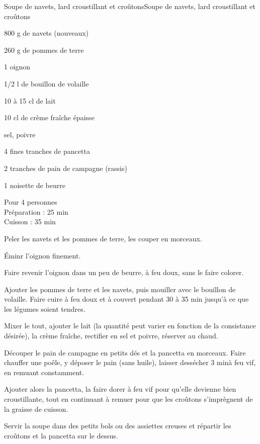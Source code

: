 \begin{recette}{Soupe de navets, lard croustillant et croûtons}{Soupe de navets, lard croustillant et croûtons}

\begin{ingredients}
800 g de navets (nouveaux)\par
260 g de pommes de terre\par
1 oignon\par
1/2 l de bouillon de volaille\par
10 à 15 cl de lait\par
10 cl de crème fraîche épaisse\par
sel, poivre\par
4 fines tranches de pancetta\par
2 tranches de pain de campagne (rassis)\par
1 noisette de beurre\par
\end{ingredients}

\begin{infos}
Pour 4 personnes\\
Préparation : 25 min\\
Cuisson : 35 min\\
\end{infos}

\begin{etapes}
\item Peler les navets et les pommes de terre, les couper en morceaux.
\item Éminr l'oignon finement.
\item Faire revenir l'oignon dans un peu de beurre, à feu doux, sans le faire colorer.
\item Ajouter les pommes de terre et les navets, puis mouiller avec le bouillon de volaille. Faire cuire à feu doux et à couvert pendant 30 à 35 min jusqu'à ce que les légumes soient tendres.
\item Mixer le tout, ajouter le lait (la quantité peut varier en fonction de la consistance désirée), la crème fraîche, rectifier en sel et poivre, réserver au chaud.
\item Découper le pain de campagne en petits dés et la pancetta en morceaux. Faire chauffer une poêle, y déposer le pain (sans huile), laisser dessécher 3 minà feu vif, en remuant constamment.
\item Ajouter alors la pancetta, la faire dorer à feu vif pour qu'elle devienne bien croustillante, tout en continuant à remuer pour que les croûtons s'imprègnent de la graisse de cuisson.
\item Servir la soupe dans des petits bols ou des assiettes creuses et répartir les croûtons et la pancetta sur le dessus.
\end{etapes}

\end{recette}